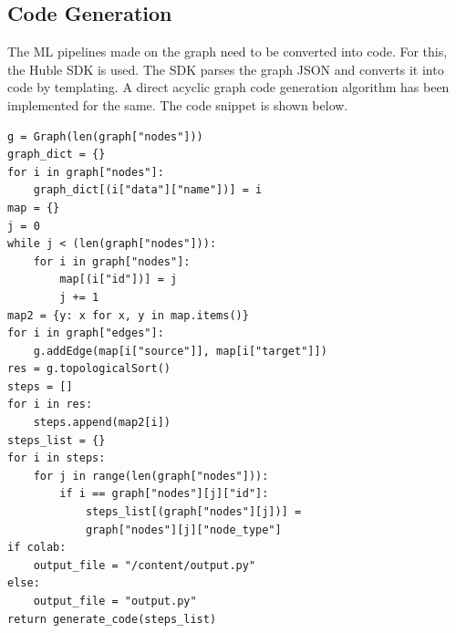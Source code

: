 \documentclass[12pt,a4paper]{report}     %
\begin{document}
\begin{normalsize}
{{{\subsection{Code Generation}
The ML pipelines made on the graph need to be converted into code. For this, the Huble SDK is used. The SDK parses the graph JSON and converts it into code by templating. A direct acyclic graph code generation algorithm has been implemented for the same. The code snippet is shown below. 
\newline


\begin{lstlisting}
g = Graph(len(graph["nodes"]))
graph_dict = {}
for i in graph["nodes"]:
    graph_dict[(i["data"]["name"])] = i
map = {}
j = 0
while j < (len(graph["nodes"])):
    for i in graph["nodes"]:
        map[(i["id"])] = j
        j += 1
map2 = {y: x for x, y in map.items()}
for i in graph["edges"]:
    g.addEdge(map[i["source"]], map[i["target"]])
res = g.topologicalSort()
steps = []
for i in res:
    steps.append(map2[i])
steps_list = {}
for i in steps:
    for j in range(len(graph["nodes"])):
        if i == graph["nodes"][j]["id"]:
            steps_list[(graph["nodes"][j])] = 
            graph["nodes"][j]["node_type"]
if colab:
    output_file = "/content/output.py"
else:
    output_file = "output.py"
return generate_code(steps_list)
\end{lstlisting}


}}}
\end{normalsize}
\end{document}
